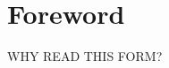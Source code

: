 \onecolumn

\chapter*{Foreword}

\begingroup
    \fontsize{12pt}{11pt}
    \selectfont

WHY READ THIS FORM?

\endgroup
\clearpage
